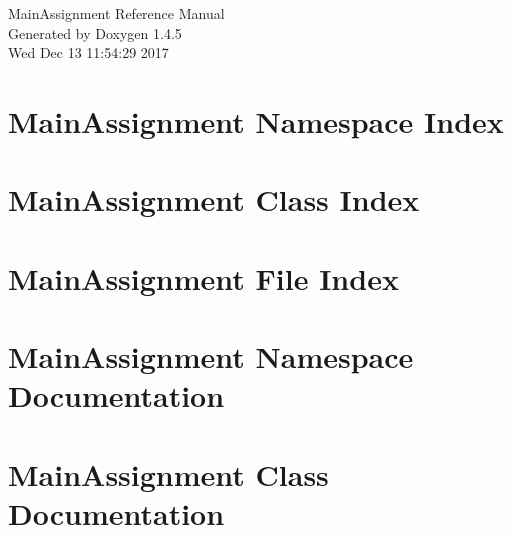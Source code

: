 \documentclass[a4paper]{book}
\begin{document}
\begin{titlepage}
\vspace*{7cm}
\begin{center}
{\Large Main\-Assignment Reference Manual}\\
\vspace*{1cm}
{\large Generated by Doxygen 1.4.5}\\
\vspace*{0.5cm}
{\small Wed Dec 13 11:54:29 2017}\\
\end{center}
\end{titlepage}
\clearemptydoublepage
{}
\tableofcontents
\clearemptydoublepage
{}
\chapter{Main\-Assignment Namespace Index}

\chapter{Main\-Assignment Class Index}

\chapter{Main\-Assignment File Index}

\chapter{Main\-Assignment Namespace Documentation}

\chapter{Main\-Assignment Class Documentation}





















\end{document}
